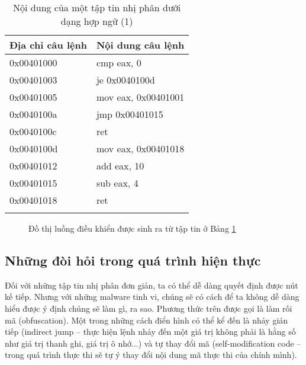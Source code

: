\begin{longtable}{ | m{3cm} | m{5cm} | }
	\hline
Địa chỉ câu lệnh & Nội dung câu lệnh\\
	\hline
	\hline
0x00401000 & cmp eax, 0 \\
	\hline
0x00401003	& je 0x0040100d \\
	\hline
0x00401005 & mov eax, 0x00401001 \\
	\hline
0x0040100a & jmp 0x00401015 \\
	\hline
0x0040100c & ret \\
	\hline
0x0040100d & mov eax, 0x00401018 \\
	\hline
0x00401012 & add eax, 10 \\
	\hline
0x00401015 & sub eax, 4 \\
	\hline
0x00401018 & ret \\
	\hline

\caption{Nội dung của một tập tin nhị phân dưới dạng hợp ngữ (1)}
\label{table:tblexcfg}
\end{longtable}

\begin{figure}[H]
\centering
{}
\caption{Đồ thị luồng điều khiển được sinh ra từ tập tin ở Bảng \ref {table:tblexcfg}} 
\label{fig:imgexcfg}
\end{figure}

	\subsection{Những đòi hỏi trong quá trình hiện thực}

Đối với những tập tin nhị phân đơn giản, ta có thể dễ dàng quyết định được nút kế tiếp. Nhưng với những malware tinh vi, chúng sẽ có cách để ta không dễ dàng hiểu được ý định chúng sẽ làm gì, ra sao. Phương thức trên được gọi là làm rối mã (obfuscation). Một trong những cách điển hình có thể kể đến là nhảy gián tiếp (indirect jump -- thực hiện lệnh nhảy đến một giá trị không phải là hằng số như giá trị thanh ghi, giá trị ô nhớ...) và tự thay đổi mã (self-modification code -- trong quá trình thực thi sẽ tự ý thay đổi nội dung mã thực thi của chính mình).\\

